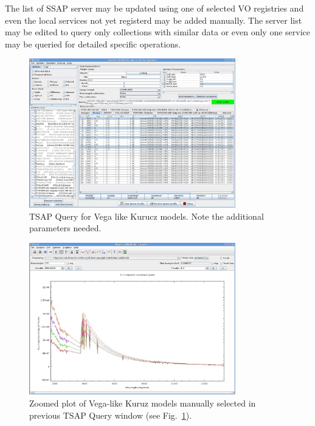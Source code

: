 \documentclass[final,authoryear,5p,times,twocolumn]{elsarticle}
\begin{document}
The list of SSAP server may be updated using one of selected VO registries and even the local
services not yet registerd may be added manually. The server list may be
edited to query only collections with similar data or even only one service
may be queried for detailed specific operations.


\begin{figure}
\begin{center}
\includegraphics[width=0.8\textwidth]{TSSA-query.pdf}
\caption{TSAP Query for Vega like Kurucz models. Note the additional parameters needed.}
\label{fig:TSAP-query}
\end{center}
\end{figure}


\begin{figure}
\begin{center}
\includegraphics[width=0.8\textwidth]{TSSA-plot.pdf}
\caption{Zoomed plot of Vega-like Kuruz models manually selected in previous TSAP Query window (see Fig.~\ref{fig:TSAP-query}). }
\label{fig:TSAP-plot}
\end{center}
\end{figure}
\end{document}
